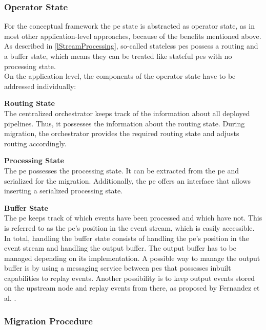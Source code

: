 \subsubsection{Operator State}
\label{lOperatorState}
For the conceptual framework the \gls{pe} state is abstracted as operator state, as in most other application-level approaches, because of the benefits mentioned above. As described in \ref{lStreamProcessing}, so-called stateless \gls{pe}s possess a routing and a buffer state, which means they can be treated like stateful \gls{pe}s with no processing state.\\
On the application level, the components of the operator state have to be addressed individually:\par

\textbf{Routing State}\\
The centralized orchestrator keeps track of the information about all deployed pipelines. Thus, it possesses the information about the routing state. During migration, the orchestrator provides the required routing state and adjusts routing accordingly.\par

\textbf{Processing State}\\
The \gls{pe} possesses the processing state. It can be extracted from the \gls{pe} and serialized for the migration. Additionally, the \gls{pe} offers an interface that allows inserting a serialized processing state.\par

\textbf{Buffer State}\\
The \gls{pe} keeps track of which events have been processed and which have not. This is referred to as the \gls{pe}'s position in the event stream, which is easily accessible. In total, handling the buffer state consists of handling the \gls{pe}'s position in the event stream and handling the output buffer. The output buffer has to be managed depending on its implementation. A possible way to manage the output buffer is by using a messaging service between \gls{pe}s that possesses inbuilt capabilities to replay events. Another possibility is to keep output events stored on the upstream node and replay events from there, as proposed by Fernandez et al. \cite{CastroFernandez.2013}.\par

\subsubsection{Migration Procedure}
\label{lMigrationProceedure}

